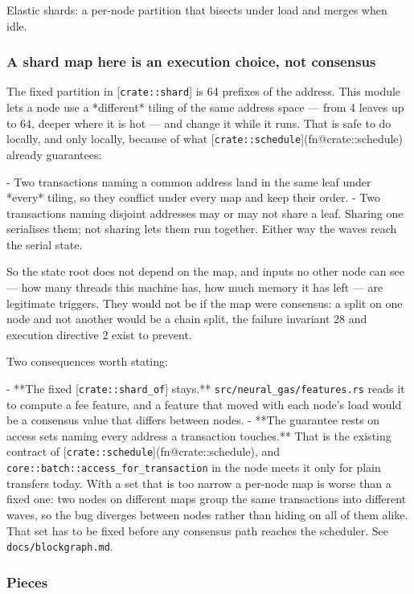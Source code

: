 \documentclass[11pt,a4paper]{article}
\begin{document}
Elastic shards: a per-node partition that bisects under load and merges
when idle.

\subsubsection{A shard map here is an execution choice, not consensus}

The fixed partition in [\texttt{crate::shard}] is 64 prefixes of the address. This
module lets a node use a *different* tiling of the same address space — from
4 leaves up to 64, deeper where it is hot — and change it while it runs.
That is safe to do locally, and only locally, because of what
[\texttt{crate::schedule}](fn@crate::schedule) already guarantees:

- Two transactions naming a common address land in the same leaf under
  *every* tiling, so they conflict under every map and keep their order.
- Two transactions naming disjoint addresses may or may not share a leaf.
  Sharing one serialises them; not sharing lets them run together. Either
  way the waves reach the serial state.

So the state root does not depend on the map, and inputs no other node can
see — how many threads this machine has, how much memory it has left — are
legitimate triggers. They would not be if the map were consensus: a split
on one node and not another would be a chain split, the failure invariant
28 and execution directive 2 exist to prevent.

Two consequences worth stating:

- **The fixed [\texttt{crate::shard\_of}] stays.** \texttt{src/neural\_gas/features.rs}
  reads it to compute a fee feature, and a feature that moved with each
  node's load would be a consensus value that differs between nodes.
- **The guarantee rests on access sets naming every address a transaction
  touches.** That is the existing contract of [\texttt{crate::schedule}](fn@crate::schedule), and
  \texttt{core::batch::access\_for\_transaction} in the node meets it only for plain
  transfers today. With a set that is too narrow a per-node map is worse
  than a fixed one: two nodes on different maps group the same transactions
  into different waves, so the bug diverges between nodes rather than
  hiding on all of them alike. That set has to be fixed before any consensus
  path reaches the scheduler. See \texttt{docs/blockgraph.md}.

\subsubsection{Pieces}
\end{document}
